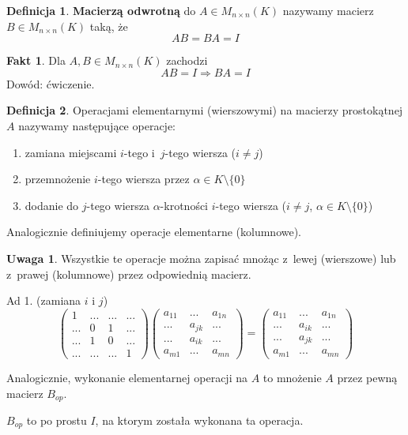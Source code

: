 \documentclass[12pt,a4paper]{article}
\theoremstyle{plain}
\theoremstyle{definition}
\newtheorem{ft}{Fakt}[section]
\theoremstyle{definition}
\newtheorem{df}{Definicja}[section]
\theoremstyle{definition}
\theoremstyle{definition}
\theoremstyle{definition}
\theoremstyle{definition}
\theoremstyle{definition}
\theoremstyle{definition}
\newtheorem*{uw}{Uwaga}
\theoremstyle{definition}
\begin{document}
\begin{df}
    \textbf{Macierzą odwrotną} do $A \in M_{n\times n}(K)$ nazywamy macierz
  $B \in M_{n\times n}(K)$ taką, że
  \[AB = BA = I\]
\end{df}

\begin{ft}
    Dla $A,B \in M_{n\times n}(K)$ zachodzi
    \[AB=I \Rightarrow BA=I\]
    Dowód: ćwiczenie.
\end{ft}

\begin{df}
    Operacjami elementarnymi (wierszowymi) na macierzy prostokątnej $A$
    nazywamy następujące operacje:
    \begin{enumerate}[{(}1{)}]
        \item zamiana miejscami $i$-tego i~$j$-tego wiersza ($i \neq j$)
        \item przemnożenie $i$-tego wiersza przez $\alpha \in K \setminus \{0\}$
        \item dodanie do $j$-tego wiersza $\alpha$-krotności $i$-tego wiersza
          ($i \neq j$, $\alpha \in K \setminus \{0\}$)
    \end{enumerate}
    Analogicznie definiujemy operacje elementarne (kolumnowe).
\end{df}

\begin{uw}
    Wszystkie te operacje można zapisać mnożąc z~lewej (wierszowe) lub
  z~prawej (kolumnowe) przez odpowiednią macierz.

  Ad 1. (zamiana $i$ i $j$)
  \[\begin{pmatrix}
     1 &...&...&...\\
    ...& 0 & 1 &...\\
    ...& 1 & 0 &...\\
    ...&...&...& 1
  \end{pmatrix}\begin{pmatrix}
    a_{11}&...&a_{1n}\\
    ...&a_{jk}&...\\
    ...&a_{ik}&...\\
    a_{m1}&...&a_{mn}
  \end{pmatrix}=\begin{pmatrix}
    a_{11}&...&a_{1n}\\
    ...&a_{ik}&...\\
    ...&a_{jk}&...\\
    a_{m1}&...&a_{mn}
  \end{pmatrix}\]

  Analogicznie, wykonanie elementarnej operacji na $A$ to
  mnożenie $A$ przez pewną macierz $B_{op}$.
  
  $B_{op}$ to po prostu $I$, na ktorym została wykonana ta operacja.
\end{uw}
\end{document}
